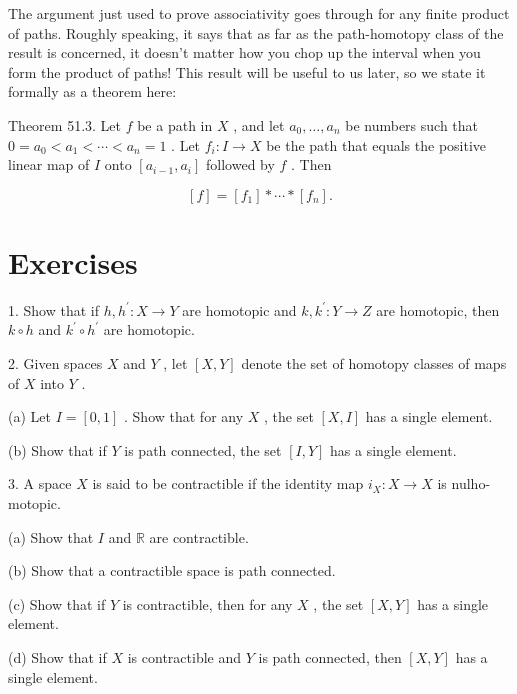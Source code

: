 The argument just used to prove associativity goes through for any finite product of paths. Roughly speaking, it says that as far as the path-homotopy class of the result is concerned, it doesn't matter how you chop up the interval when you form the product of paths! This result will be useful to us later, so we state it formally as a theorem here:

Theorem 51.3. Let \(f\) be a path in \(X\) , and let \({a}_{0},\ldots ,{a}_{n}\) be numbers such that \(0 = {a}_{0} < {a}_{1} < \cdots  < {a}_{n} = 1\) . Let \({f}_{i} : I \rightarrow  X\) be the path that equals the positive linear map of \(I\) onto \(\left\lbrack  {{a}_{i - 1},{a}_{i}}\right\rbrack\) followed by \(f\) . Then

\[
\left\lbrack  f\right\rbrack   = \left\lbrack  {f}_{1}\right\rbrack   * \cdots  * \left\lbrack  {f}_{n}\right\rbrack  .
\]

\section*{Exercises}

1. Show that if \(h,{h}^{\prime } : X \rightarrow  Y\) are homotopic and \(k,{k}^{\prime } : Y \rightarrow  Z\) are homotopic, then \(k \circ  h\) and \({k}^{\prime } \circ  {h}^{\prime }\) are homotopic.

2. Given spaces \(X\) and \(Y\) , let \(\left\lbrack  {X,Y}\right\rbrack\) denote the set of homotopy classes of maps of \(X\) into \(Y\) .

(a) Let \(I = \left\lbrack  {0,1}\right\rbrack\) . Show that for any \(X\) , the set \(\left\lbrack  {X,I}\right\rbrack\) has a single element.

(b) Show that if \(Y\) is path connected, the set \(\left\lbrack  {I,Y}\right\rbrack\) has a single element.

3. A space \(X\) is said to be contractible if the identity map \({i}_{X} : X \rightarrow  X\) is nulho-motopic.

(a) Show that \(I\) and \(\mathbb{R}\) are contractible.

(b) Show that a contractible space is path connected.

(c) Show that if \(Y\) is contractible, then for any \(X\) , the set \(\left\lbrack  {X,Y}\right\rbrack\) has a single element.

(d) Show that if \(X\) is contractible and \(Y\) is path connected, then \(\left\lbrack  {X,Y}\right\rbrack\) has a single element.

